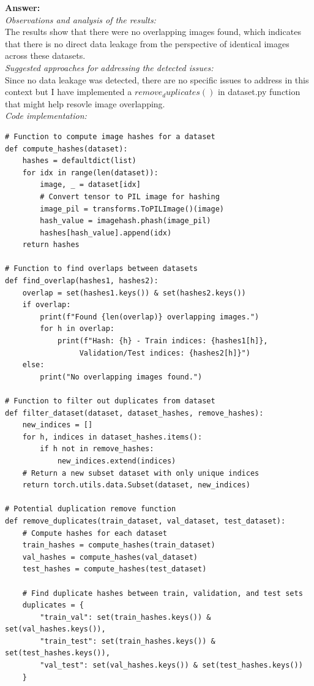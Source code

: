 \documentclass[11pt, oneside]{article}   	%
\begin{document}
\textbf{Answer:} 
\\
\textit{Observations and analysis of the results: }
\\
The results show that there were no overlapping images found, which indicates that there is no direct data leakage from the perspective of identical images across these datasets.
\\
\textit{Suggested approaches for addressing the detected issues: }
\\
Since no data leakage was detected, there are no specific issues to address in this context but I have implemented a $remove_duplicates()$ in dataset.py function that might help resovle image overlapping.
\\
\textit{Code implementation: }
\begin{verbatim}
# Function to compute image hashes for a dataset
def compute_hashes(dataset):
    hashes = defaultdict(list)
    for idx in range(len(dataset)):
        image, _ = dataset[idx]
        # Convert tensor to PIL image for hashing
        image_pil = transforms.ToPILImage()(image)
        hash_value = imagehash.phash(image_pil)
        hashes[hash_value].append(idx)
    return hashes

# Function to find overlaps between datasets
def find_overlap(hashes1, hashes2):
    overlap = set(hashes1.keys()) & set(hashes2.keys())
    if overlap:
        print(f"Found {len(overlap)} overlapping images.")
        for h in overlap:
            print(f"Hash: {h} - Train indices: {hashes1[h]},
                 Validation/Test indices: {hashes2[h]}")
    else:
        print("No overlapping images found.")

# Function to filter out duplicates from dataset
def filter_dataset(dataset, dataset_hashes, remove_hashes):
    new_indices = []
    for h, indices in dataset_hashes.items():
        if h not in remove_hashes:
            new_indices.extend(indices)
    # Return a new subset dataset with only unique indices
    return torch.utils.data.Subset(dataset, new_indices)

# Potential duplication remove function
def remove_duplicates(train_dataset, val_dataset, test_dataset):
    # Compute hashes for each dataset
    train_hashes = compute_hashes(train_dataset)
    val_hashes = compute_hashes(val_dataset)
    test_hashes = compute_hashes(test_dataset)

    # Find duplicate hashes between train, validation, and test sets
    duplicates = {
        "train_val": set(train_hashes.keys()) & set(val_hashes.keys()),
        "train_test": set(train_hashes.keys()) & set(test_hashes.keys()),
        "val_test": set(val_hashes.keys()) & set(test_hashes.keys())
    }


\end{verbatim}
\end{document}
